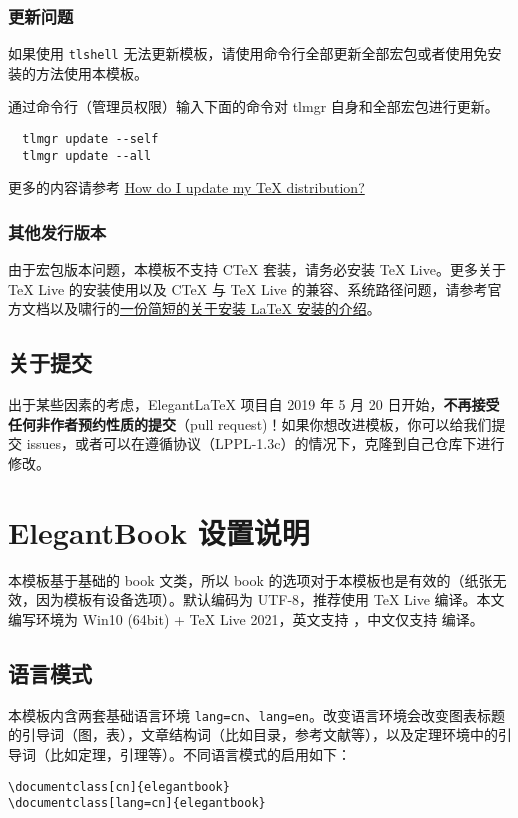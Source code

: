\documentclass[cn,10pt,math=newtx,citestyle=gb7714-2015,bibstyle=gb7714-2015]{elegantbook}
\begin{document}
\subsection{更新问题}

如果使用 \lstinline{tlshell} 无法更新模板，请使用命令行全部更新全部宏包或者使用免安装的方法使用本模板。

通过命令行（管理员权限）输入下面的命令对 tlmgr 自身和全部宏包进行更新。

\begin{lstlisting}
  tlmgr update --self 
  tlmgr update --all
\end{lstlisting}

更多的内容请参考 \href{https://tex.stackexchange.com/questions/55437/how-do-i-update-my-tex-distribution}{How do I update my \TeX{} distribution?}

\subsection{其他发行版本}

由于宏包版本问题，本模板不支持 C\TeX{} 套装，请务必安装 TeX Live。更多关于 \TeX{} Live 的安装使用以及 C\TeX{} 与 \TeX{} Live 的兼容、系统路径问题，请参考官方文档以及啸行的\href{https://github.com/OsbertWang/install-latex-guide-zh-cn/releases/}{一份简短的关于安装 \LaTeX{} 安装的介绍}。


\section{关于提交}

出于某些因素的考虑，Elegant\LaTeX{} 项目自 2019 年 5 月 20 日开始，\textbf{不再接受任何非作者预约性质的提交}（pull request)！如果你想改进模板，你可以给我们提交 issues，或者可以在遵循协议（LPPL-1.3c）的情况下，克隆到自己仓库下进行修改。


\chapter{ElegantBook 设置说明}

本模板基于基础的 book 文类，所以 book 的选项对于本模板也是有效的（纸张无效，因为模板有设备选项）。默认编码为 UTF-8，推荐使用 \TeX{} Live 编译。本文编写环境为 Win10 (64bit) + \TeX{} Live 2021，英文支持 ，中文仅支持  编译。

\section{语言模式}
本模板内含两套基础语言环境 \lstinline{lang=cn}、\lstinline{lang=en}。改变语言环境会改变图表标题的引导词（图，表），文章结构词（比如目录，参考文献等），以及定理环境中的引导词（比如定理，引理等）。不同语言模式的启用如下：
\begin{lstlisting}
\documentclass[cn]{elegantbook} 
\documentclass[lang=cn]{elegantbook}
\end{lstlisting}
\end{document}
